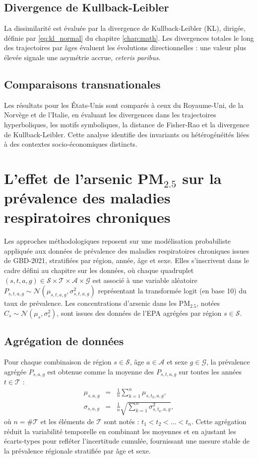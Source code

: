 \subsection{Divergence de Kullback-Leibler}

La dissimilarité est évaluée par la divergence de Kullback-Leibler (KL), dirigée, définie par \eqref{eq:kl_normal} du chapitre \ref{chap:math}. Les divergences totales le long des trajectoires par âges évaluent les évolutions directionnelles : une valeur plus élevée signale une asymétrie accrue, \emph{ceteris paribus}.

\subsection{Comparaisons transnationales}

Les résultats pour les États-Unis sont comparés à ceux du Royaume-Uni, de la Norvège et de l'Italie, en évaluant les divergences dans les trajectoires hyperboliques, les motifs symboliques, la distance de Fisher-Rao et la divergence de Kullback-Leibler. Cette analyse identifie des invariants ou hétérogénéités liées à des contextes socio-économiques distincts.

\section{L'effet de l'arsenic PM$_{2.5}$ sur la prévalence des maladies respiratoires chroniques}
Les approches méthodologiques reposent sur une modélisation probabiliste appliquée aux données de prévalence des maladies respiratoires chroniques issues de GBD-2021, stratifiées par région, année, âge et sexe. Elles s'inscrivent dans le cadre défini au chapitre sur les données, où chaque quadruplet $(s, t, a, g) \in \mathcal{S} \times \mathcal{T} \times \mathcal{A} \times \mathcal{G}$ est associé à une variable aléatoire $P_{s,t,a,g} \sim \mathcal{N}(\mu_{s,t,a,g}, \sigma_{s,t,a,g}^2)$ représentant la transformée logit (en base 10) du taux de prévalence. Les concentrations d'arsenic dans les PM$_{2.5}$, notées $C_s \sim \mathcal{N}(\mu_s, \sigma_s^2)$, sont issues des données de l'EPA agrégées par région $s \in \mathcal{S}$.

\subsection{Agrégation de données}
Pour chaque combinaison de région $s \in \mathcal{S}$, âge $a \in \mathcal{A}$ et sexe $g \in \mathcal{G}$, la prévalence agrégée $P_{s,a,g}$ est obtenue comme la moyenne des $P_{s,t,a,g}$ sur toutes les années $t \in \mathcal{T}$ :
\begin{eqnarray}
\mu_{s,a,g} &=& \frac{1}{n} \sum_{k=1}^n \mu_{s,t_k,a,g}, \\
\sigma_{s,a,g} &=& \frac{1}{n} \sqrt{\sum_{k=1}^n \sigma_{s,t_k,a,g}^2},
\end{eqnarray}
où $n = \#\mathcal{T}$ et les éléments de $\mathcal{T}$ sont notés : $t_1 < t_2 < ... < t_n$. Cette agrégation réduit la variabilité temporelle en combinant les moyennes et en ajustant les écarts-types pour refléter l'incertitude cumulée, fournissant une mesure stable de la prévalence régionale stratifiée par âge et sexe.

